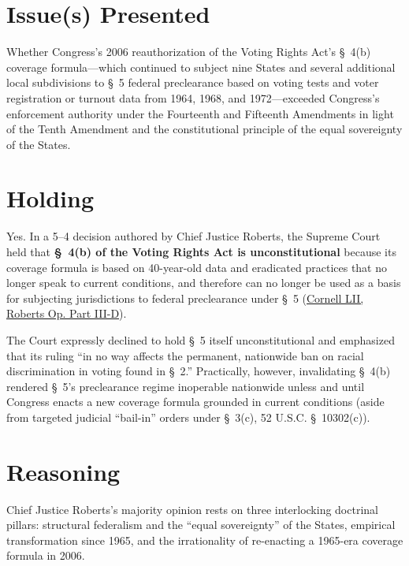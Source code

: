 \documentclass[12pt]{article}
\begin{document}
\section{Issue(s) Presented}

Whether Congress's 2006 reauthorization of the Voting Rights Act's \S~4(b) coverage formula---which continued to subject nine States and several additional local subdivisions to \S~5 federal preclearance based on voting tests and voter registration or turnout data from 1964, 1968, and 1972---exceeded Congress's enforcement authority under the Fourteenth and Fifteenth Amendments in light of the Tenth Amendment and the constitutional principle of the equal sovereignty of the States.

\section{Holding}

Yes. In a 5--4 decision authored by Chief Justice Roberts, the Supreme Court held that \textbf{\S~4(b) of the Voting Rights Act is unconstitutional} because its coverage formula is based on 40-year-old data and eradicated practices that no longer speak to current conditions, and therefore can no longer be used as a basis for subjecting jurisdictions to federal preclearance under \S~5 (\href{https://www.law.cornell.edu/supremecourt/text/12-96}{Cornell LII, Roberts Op. Part III-D}).

The Court expressly declined to hold \S~5 itself unconstitutional and emphasized that its ruling ``in no way affects the permanent, nationwide ban on racial discrimination in voting found in \S~2.'' Practically, however, invalidating \S~4(b) rendered \S~5's preclearance regime inoperable nationwide unless and until Congress enacts a new coverage formula grounded in current conditions (aside from targeted judicial ``bail-in'' orders under \S~3(c), 52 U.S.C. \S~10302(c)).

\section{Reasoning}

Chief Justice Roberts's majority opinion rests on three interlocking doctrinal pillars: structural federalism and the ``equal sovereignty'' of the States, empirical transformation since 1965, and the irrationality of re-enacting a 1965-era coverage formula in 2006.
\end{document}
